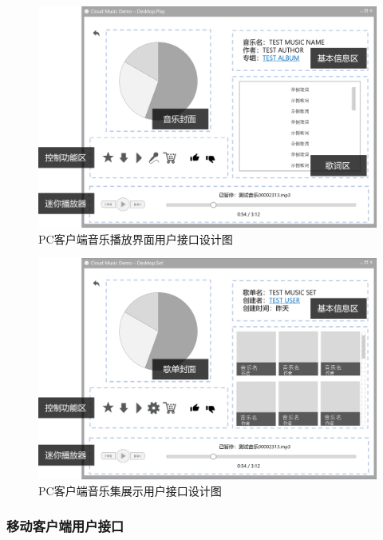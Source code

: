 \begin{figure}[h!]
  \centering
 
  \includegraphics[width=.95\linewidth]{figures/desttop_music}

  \caption{ \label{fig:desttop_music}
  		PC客户端音乐播放界面用户接口设计图
    }
\end{figure}

\begin{figure}[h!]
  \centering

  \includegraphics[width=.95\linewidth]{figures/desttop_collection}

  \caption{  \label{fig:desttop_collection}
  		PC客户端音乐集展示用户接口设计图
    }
\end{figure}


\subsubsection{移动客户端用户接口} %

